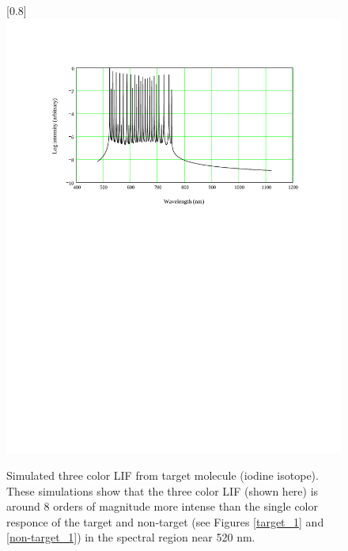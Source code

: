 \begin{figure}
\scalebox{0.8}[0.8]{
\includegraphics[bb=50 450 489 680]
{target_3/target_3.pdf}
}
\caption[Simulated three color LIF from target molecule (iodine isotope)]{Simulated three color LIF from target molecule (iodine isotope). These simulations show that the three color LIF (shown here) is around 8 orders of magnitude more intense than the single color responce of the target and non-target (see Figures \ref{target_1} and \ref{non-target_1}) in the spectral region near 520 nm.}
\label{target_3}
\end{figure}
